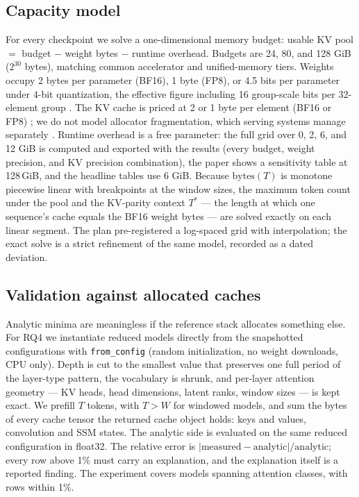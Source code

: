 \subsection{Capacity model}\label{dm:capacity}
For every checkpoint we solve a one-dimensional memory budget: usable KV pool $=$ budget
$-$ weight bytes $-$ runtime overhead. Budgets are 24, 80, and 128 GiB ($2^{30}$ bytes),
matching common accelerator and unified-memory tiers. Weights occupy 2 bytes per parameter
(BF16), 1 byte (FP8), or 4.5 bits per parameter under 4-bit quantization, the effective
figure including 16 group-scale bits per 32-element group \cite{frantar2022gptq}. The KV
cache is priced at 2 or 1 byte per element (BF16 or FP8) \cite{liu2024kivi}; we do not
model allocator fragmentation, which serving systems manage separately
\cite{kwon2023paged}. Runtime overhead is a free parameter: the full grid over
0, 2, 6, and 12 GiB is computed and exported with the results (every budget, weight
precision, and KV precision combination), the paper shows a sensitivity table at
128\,GiB, and the headline tables use 6 GiB. Because $\mathrm{bytes}(T)$ is
monotone piecewise linear with breakpoints at the window sizes, the maximum token count
under the pool and the KV-parity context $T^{*}$ --- the length at which one sequence's
cache equals the BF16 weight bytes --- are solved exactly on each linear segment. The plan
pre-registered a log-spaced grid with interpolation; the exact solve is a strict
refinement of the same model, recorded as a dated deviation.

\subsection{Validation against allocated caches}\label{dm:validation}
Analytic minima are meaningless if the reference stack allocates something else. For RQ4
we instantiate reduced models directly from the snapshotted configurations with
\texttt{from\_config} (random initialization, no weight downloads, CPU only). Depth is cut
to the smallest value that preserves one full period of the layer-type pattern, the
vocabulary is shrunk, and per-layer attention geometry --- KV heads, head dimensions,
latent ranks, window sizes --- is kept exact. We prefill $T$ tokens, with $T>W$ for
windowed models, and sum the bytes of every cache tensor the returned cache object holds:
keys and values, convolution and SSM states. The analytic side is evaluated on the same
reduced configuration in float32. The relative error is
$\lvert\mathrm{measured}-\mathrm{analytic}\rvert/\mathrm{analytic}$; every row above 1\%
must carry an explanation, and the explanation itself is a reported finding. The
experiment covers \kvcValRows{} models spanning \kvcValClasses{} attention classes, with
\kvcValWithin{} rows within 1\%.
